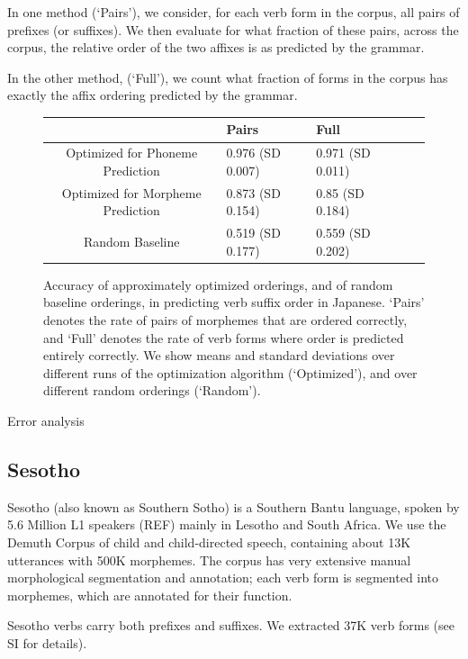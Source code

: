 In one method (`Pairs'), we consider, for each verb form in the corpus, all pairs of prefixes (or suffixes).
We then evaluate for what fraction of these pairs, across the corpus, the relative order of the two affixes is as predicted by the grammar.

In the other method, (`Full'), we count what fraction of forms in the corpus has exactly the affix ordering predicted by the grammar.


\begin{figure}
\begin{center}
\begin{tabular}{c||ll|ll}
             &       Pairs & Full \\ \hline\hline
Optimized for Phoneme Prediction   &   0.976 (SD 0.007) & 0.971 (SD 0.011) \\
Optimized for Morpheme Prediction  &   0.873 (SD 0.154) & 0.85 (SD 0.184) \\
Random Baseline     &  0.519 (SD 0.177) & 0.559 (SD 0.202) \\
\end{tabular}
\end{center}
\caption{Accuracy of approximately optimized orderings, and of random baseline orderings, in predicting verb suffix order in Japanese. `Pairs' denotes the rate of pairs of morphemes that are ordered correctly, and `Full' denotes the rate of verb forms where order is predicted entirely correctly. We show means and standard deviations over different runs of the optimization algorithm (`Optimized'), and over different random orderings (`Random').}\label{fig:acc-japanese}
\end{figure}

Error analysis





\subsection{Sesotho}

Sesotho (also known as Southern Sotho) is a Southern Bantu language, spoken by 5.6 Million L1 speakers (REF) mainly in Lesotho and South Africa.
We use the Demuth Corpus \citep{demuth1992acquisition} of child and child-directed speech, containing about 13K utterances with 500K morphemes.
The corpus has very extensive manual morphological segmentation and annotation; each verb form is segmented into morphemes, which are annotated for their function.

Sesotho verbs carry both prefixes and suffixes.
We extracted 37K verb forms (see SI for details).


